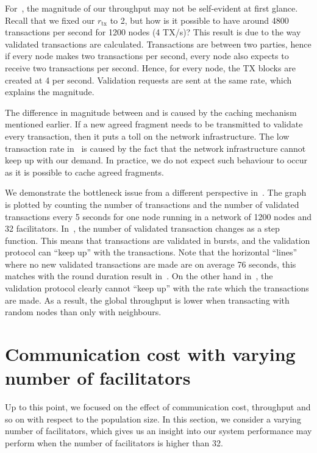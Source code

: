 For~,
the magnitude of our throughput may not be self-evident at first glance.
Recall that we fixed our $r_\text{tx}$ to 2, but how is it possible to have around 4800 transactions per second for 1200 nodes (4 TX/s)?
This result is due to the way validated transactions are calculated.
Transactions are between two parties, hence if every node makes two transactions per second,
every node also expects to receive two transactions per second.
Hence, for every node, the TX blocks are created at 4 per second.
Validation requests are sent at the same rate, which explains the magnitude.

The difference in magnitude between  and  is caused by the caching mechanism mentioned earlier.
If a new agreed fragment needs to be transmitted to validate every transaction,
then it puts a toll on the network infrastructure.
The low transaction rate in~ is caused by the fact that the network infrastructure cannot keep up with our demand.
In practice, we do not expect such behaviour to occur as it is possible to cache agreed fragments.

We demonstrate the bottleneck issue from a different perspective in~.
The graph is plotted by counting the number of transactions and the number of validated transactions every 5 seconds for one node running in a network of 1200 nodes and 32 facilitators.
In~, the number of validated transaction changes as a step function.
This means that transactions are validated in bursts, and the validation protocol can ``keep up'' with the transactions.
Note that the horizontal ``lines'' where no new validated transactions are made are on average 76 seconds, this matches with the round duration result in~.
On the other hand in~, the validation protocol clearly cannot ``keep up'' with the rate which the transactions are made.
As a result, the global throughput is lower when transacting with random nodes than only with neighbours.

\section{Communication cost with varying number of facilitators}
\label{sec:varying-facilitator-experiment}
Up to this point, we focused on the effect of communication cost, throughput and so on with respect to the population size.
In this section, we consider a varying number of facilitators,
which gives us an insight into our system performance may perform when the number of facilitators is higher than 32.

